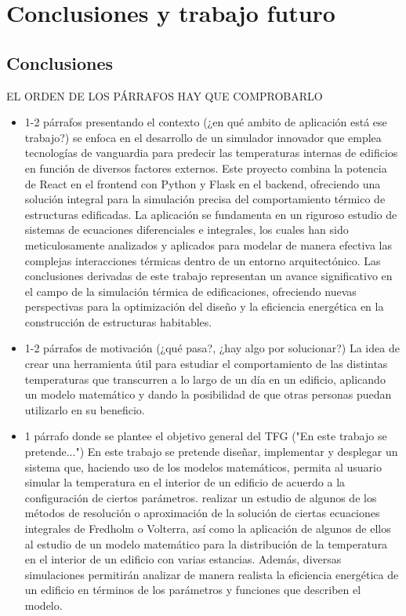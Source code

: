 \chapter{Conclusiones y trabajo futuro}
\section{Conclusiones}
EL ORDEN DE LOS PÁRRAFOS HAY QUE COMPROBARLO
\begin{itemize}
	\item 1-2 párrafos presentando el contexto (¿en qué ambito de aplicación está ese trabajo?) se enfoca en el desarrollo de un simulador innovador que emplea tecnologías de vanguardia para predecir las temperaturas internas de edificios en función de diversos factores externos. Este proyecto combina la potencia de React en el frontend con Python y Flask en el backend, ofreciendo una solución integral para la simulación precisa del comportamiento térmico de estructuras edificadas. La aplicación se fundamenta en un riguroso estudio de sistemas de ecuaciones diferenciales e integrales, los cuales han sido meticulosamente analizados y aplicados para modelar de manera efectiva las complejas interacciones térmicas dentro de un entorno arquitectónico. Las conclusiones derivadas de este trabajo representan un avance significativo en el campo de la simulación térmica de edificaciones, ofreciendo nuevas perspectivas para la optimización del diseño y la eficiencia energética en la construcción de estructuras habitables.
	\item 1-2 párrafos de motivación (¿qué pasa?, ¿hay algo por solucionar?) La idea de crear una herramienta útil para estudiar el comportamiento de las distintas temperaturas que transcurren a lo largo de un día en un edificio, aplicando un modelo matemático y dando la posibilidad de que otras personas puedan utilizarlo en su beneficio.
	\item 1 párrafo donde se plantee el objetivo general del TFG ("En este trabajo se pretende...") En este trabajo se pretende diseñar, implementar y desplegar un sistema que, haciendo uso de los modelos matemáticos, permita al usuario simular la temperatura en el interior de un edificio de acuerdo a la configuración de ciertos parámetros. realizar un estudio de algunos de los métodos de resolución o aproximación de la solución de ciertas ecuaciones integrales de Fredholm o Volterra, así como la aplicación de algunos de ellos al estudio de un modelo matemático para la distribución de la temperatura en el interior de un edificio con varias estancias. Además, diversas simulaciones permitirán analizar de manera realista la eficiencia energética de un edificio en términos de los parámetros y funciones que describen el modelo.

\end{itemize}
